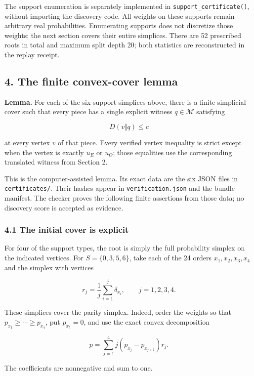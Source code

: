 The support enumeration is separately implemented in
\texttt{support\_certificate()}, without importing the discovery code.
All weights on these supports remain arbitrary real probabilities.
Enumerating supports does not discretize those weights; the next section
covers their entire simplices. There are 52 prescribed roots in total
and maximum split depth 20; both statistics are reconstructed in the
replay receipt.

\subsection{4. The finite convex-cover
lemma}\label{the-finite-convex-cover-lemma}

\textbf{Lemma.} For each of the six support simplices above, there is a
finite simplicial cover such that every piece has a single explicit
witness \(q\in\mathcal M\) satisfying

\[
D(v\Vert q)\le c
\tag{8}
\]

at every vertex \(v\) of that piece. Every verified vertex inequality is
strict except when the vertex is exactly \(u_E\) or \(u_O\); those
equalities use the corresponding translated witness from Section 2.

This is the computer-assisted lemma. Its exact data are the six JSON
files in \texttt{certificates/}. Their hashes appear in
\texttt{verification.json} and the bundle manifest. The checker proves
the following finite assertions from those data; no discovery score is
accepted as evidence.

\subsubsection{4.1 The initial cover is
explicit}\label{the-initial-cover-is-explicit}

For four of the support types, the root is simply the full probability
simplex on the indicated vertices. For \(S=\{0,3,5,6\}\), take each of
the 24 orders \(x_1,x_2,x_3,x_4\) and the simplex with vertices

\[
r_j=\frac1j\sum_{i=1}^j\delta_{x_i},\qquad j=1,2,3,4.
\tag{9}
\]

These simplices cover the parity simplex. Indeed, order the weights so
that \(p_{x_1}\ge\cdots\ge p_{x_4}\), put \(p_{x_5}=0\), and use the
exact convex decomposition

\[
p=\sum_{j=1}^4 j(p_{x_j}-p_{x_{j+1}})r_j.
\tag{10}
\]

The coefficients are nonnegative and sum to one.

